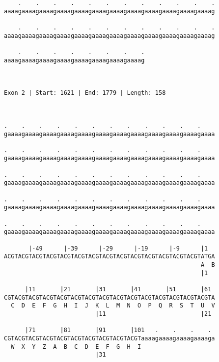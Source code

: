 \documentclass{article}
\begin{document}
\begin{Verbatim}
    .    .    .    .    .    .    .    .    .    .    .    .
aaaagaaaagaaaagaaaagaaaagaaaagaaaagaaaagaaaagaaaagaaaagaaaag
                                                            
    .    .    .    .    .    .    .    .    .    .    .    .
aaaagaaaagaaaagaaaagaaaagaaaagaaaagaaaagaaaagaaaagaaaagaaaag
                                                            
    .    .    .    .    .    .    .    .
aaaagaaaagaaaagaaaagaaaagaaaagaaaagaaaag
                                        
                                        
 
Exon 2 | Start: 1621 | End: 1779 | Length: 158



.    .    .    .    .    .    .    .    .    .    .    .    
gaaaagaaaagaaaagaaaagaaaagaaaagaaaagaaaagaaaagaaaagaaaagaaaa
                                                            
.    .    .    .    .    .    .    .    .    .    .    .    
gaaaagaaaagaaaagaaaagaaaagaaaagaaaagaaaagaaaagaaaagaaaagaaaa
                                                            
.    .    .    .    .    .    .    .    .    .    .    .    
gaaaagaaaagaaaagaaaagaaaagaaaagaaaagaaaagaaaagaaaagaaaagaaaa
                                                            
.    .    .    .    .    .    .    .    .    .    .    .    
gaaaagaaaagaaaagaaaagaaaagaaaagaaaagaaaagaaaagaaaagaaaagaaaa
                                                            
.    .    .    .    .    .    .    .    .    .    .    .    
gaaaagaaaagaaaagaaaagaaaagaaaagaaaagaaaagaaaagaaaagaaaagaaaa
                                                            
       |-49      |-39      |-29      |-19      |-9      |1  
ACGTACGTACGTACGTACGTACGTACGTACGTACGTACGTACGTACGTACGTACGTATGA
                                                        A  B
                                                        |1  
  
      |11       |21       |31       |41       |51       |61 
CGTACGTACGTACGTACGTACGTACGTACGTACGTACGTACGTACGTACGTACGTACGTA
  C  D  E  F  G  H  I  J  K  L  M  N  O  P  Q  R  S  T  U  V
                          |11                           |21 
  
      |71       |81       |91       |101   .    .    .    . 
CGTACGTACGTACGTACGTACGTACGTACGTACGTACGTaaaagaaaagaaaagaaaaga
  W  X  Y  Z  A  B  C  D  E  F  G  H  I                     
                          |31                               
  

\end{Verbatim}
\end{document}
